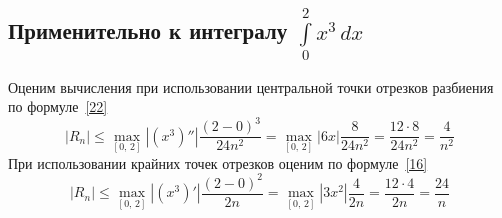 \documentclass[a4paper, 11pt]{article}
\begin{document}
	\subsection{Применительно к интегралу $\int\limits_0^2 x^3\, dx$}
	Оценим вычисления при использовании центральной точки отрезков разбиения по формуле~\ref{22}
	\begin{equation}\label{key}
		\left|R_n\right| \leqslant \max\limits_{[0,\,2]} \left|(x^3)''\right| \frac{(2-0)^3}{24n^2} = \max\limits_{[0,\,2]} \left|6x\right| \frac{8}{24n^2} = \frac{12\cdot8}{24n^2} = \frac4{n^2}
	\end{equation}
	При использовании крайних точек отрезков оценим по формуле~\ref{16}
	\begin{equation}
		\left|R_n\right| \leqslant \max\limits_{[0,\,2]} \left|(x^3)'\right| \frac{(2-0)^2}{2n} = \max\limits_{[0,\,2]} \left|3x^2\right| \frac{4}{2n} = \frac{12\cdot4}{2n} = \frac{24}{n}
	\end{equation}
\end{document}
